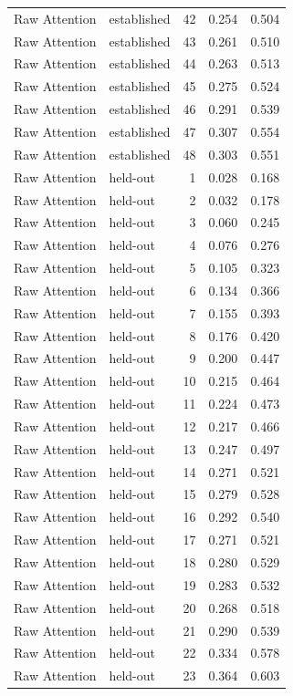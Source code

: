 \begin{tabular}{llrrr}
Raw Attention & established & 42 & 0.254 & 0.504 \\
Raw Attention & established & 43 & 0.261 & 0.510 \\
Raw Attention & established & 44 & 0.263 & 0.513 \\
Raw Attention & established & 45 & 0.275 & 0.524 \\
Raw Attention & established & 46 & 0.291 & 0.539 \\
Raw Attention & established & 47 & 0.307 & 0.554 \\
Raw Attention & established & 48 & 0.303 & 0.551 \\
Raw Attention & held-out & 1 & 0.028 & 0.168 \\
Raw Attention & held-out & 2 & 0.032 & 0.178 \\
Raw Attention & held-out & 3 & 0.060 & 0.245 \\
Raw Attention & held-out & 4 & 0.076 & 0.276 \\
Raw Attention & held-out & 5 & 0.105 & 0.323 \\
Raw Attention & held-out & 6 & 0.134 & 0.366 \\
Raw Attention & held-out & 7 & 0.155 & 0.393 \\
Raw Attention & held-out & 8 & 0.176 & 0.420 \\
Raw Attention & held-out & 9 & 0.200 & 0.447 \\
Raw Attention & held-out & 10 & 0.215 & 0.464 \\
Raw Attention & held-out & 11 & 0.224 & 0.473 \\
Raw Attention & held-out & 12 & 0.217 & 0.466 \\
Raw Attention & held-out & 13 & 0.247 & 0.497 \\
Raw Attention & held-out & 14 & 0.271 & 0.521 \\
Raw Attention & held-out & 15 & 0.279 & 0.528 \\
Raw Attention & held-out & 16 & 0.292 & 0.540 \\
Raw Attention & held-out & 17 & 0.271 & 0.521 \\
Raw Attention & held-out & 18 & 0.280 & 0.529 \\
Raw Attention & held-out & 19 & 0.283 & 0.532 \\
Raw Attention & held-out & 20 & 0.268 & 0.518 \\
Raw Attention & held-out & 21 & 0.290 & 0.539 \\
Raw Attention & held-out & 22 & 0.334 & 0.578 \\
Raw Attention & held-out & 23 & 0.364 & 0.603 \\

\end{tabular}
